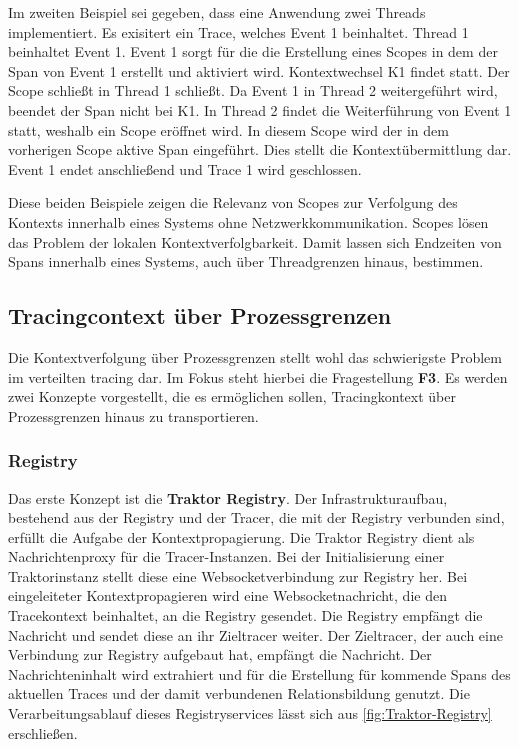 Im zweiten Beispiel sei gegeben, dass eine Anwendung zwei Threads implementiert. Es exisitert ein Trace, welches Event 1 beinhaltet. Thread 1 beinhaltet Event 1. Event 1 sorgt für die die Erstellung eines Scopes in dem der Span von Event 1 erstellt und aktiviert wird. Kontextwechsel K1 findet statt. Der Scope schließt in Thread 1 schließt. Da Event 1 in Thread 2 weitergeführt wird, beendet der Span nicht bei K1. In Thread 2 findet die Weiterführung von Event 1 statt, weshalb ein Scope eröffnet wird. In diesem Scope wird der in dem vorherigen Scope aktive Span eingeführt. Dies stellt die Kontextübermittlung dar. Event 1 endet anschließend und Trace 1 wird geschlossen.

Diese beiden Beispiele zeigen die Relevanz von Scopes zur Verfolgung des Kontexts innerhalb eines Systems ohne Netzwerkkommunikation. Scopes lösen das Problem der lokalen  Kontextverfolgbarkeit. Damit lassen sich Endzeiten von Spans innerhalb eines Systems, auch über Threadgrenzen hinaus, bestimmen. 

\subsection{Tracingcontext über Prozessgrenzen}
\label{subsection:Tracingcontext über Systemgrenzen}

Die Kontextverfolgung über Prozessgrenzen stellt wohl das schwierigste Problem im verteilten tracing dar. Im Fokus steht hierbei die Fragestellung \textbf{F3}. Es werden zwei Konzepte vorgestellt, die es ermöglichen sollen, Tracingkontext über Prozessgrenzen hinaus zu transportieren. 


\subsubsection{Registry}
Das erste Konzept ist die \textbf{Traktor Registry}. 
Der Infrastrukturaufbau, bestehend aus der Registry und der Tracer, die mit der Registry verbunden sind, erfüllt die Aufgabe der Kontextpropagierung. Die Traktor Registry dient als Nachrichtenproxy für die Tracer-Instanzen. Bei der Initialisierung einer Traktorinstanz stellt diese eine Websocketverbindung zur Registry her. Bei eingeleiteter Kontextpropagieren wird eine Websocketnachricht, die den Tracekontext beinhaltet, an die Registry gesendet. Die Registry empfängt die Nachricht und sendet diese an ihr Zieltracer weiter. Der Zieltracer, der auch eine Verbindung zur Registry aufgebaut hat, empfängt die Nachricht. Der Nachrichteninhalt wird extrahiert und für die Erstellung für kommende Spans des aktuellen Traces und der damit verbundenen Relationsbildung genutzt. Die Verarbeitungsablauf dieses Registryservices lässt sich aus \cref{fig:Traktor-Registry} erschließen.

